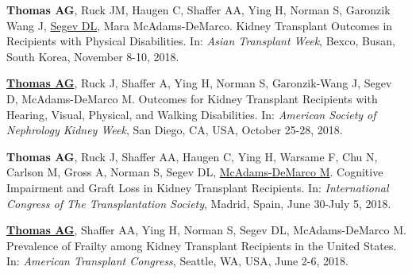 \documentclass[10pt]{article}
\makeatletter
\newlength{\bibhang}
\newlength{\bibsep}
 {\@listi \global\bibsep\itemsep \global\advance\bibsep by\parsep}
\newenvironment{bibenum*}
  {\renewcommand\labelenumi{[\theenumi]}%
   \etaremune[
     topsep=0pt,
     itemsep=\bibsep,
     parsep=0pt,partopsep=0pt,
     itemindent=-\bibhang,
     leftmargin={\bibhang+\widthof{[999]}}]}
  {\endetaremune}
\makeatother
\begin{document}
\begin{bibenum*}
\item \textbf{Thomas AG}, Ruck JM, Haugen C, Shaffer AA, Ying H,
  Norman S, Garonzik Wang J, \underline{Segev DL}, Mara McAdams-DeMarco.
  Kidney Transplant Outcomes in Recipients with Physical Disabilities.
  In: \emph{Asian Transplant Week},
  Bexco, Busan, South Korea, November 8-10, 2018.

\item \underline{\textbf{Thomas AG}}, Ruck J, Shaffer A, Ying H, Norman S,
  Garonzik-Wang J, Segev D, McAdams-DeMarco M.
  Outcomes for Kidney Transplant Recipients with Hearing, Visual, Physical,
  and Walking Disabilities.
  In: \emph{American Society of Nephrology Kidney Week},
  San Diego, CA, USA, October 25-28, 2018.


\item \textbf{Thomas AG}, Ruck J, Shaffer AA, Haugen C, Ying H,
  Warsame F, Chu N, Carlson M, Gross A, Norman S,
  Segev DL, \underline{McAdams-DeMarco M}.
  Cognitive Impairment and Graft Loss in Kidney Transplant Recipients.
  In: \emph{International Congress of The Transplantation Society},
  Madrid, Spain, June 30-July 5, 2018.



\item \underline{\textbf{Thomas AG}}, Shaffer AA, Ying H, Norman S,
  Segev DL, McAdams-DeMarco M.
  Prevalence of Frailty among Kidney Transplant Recipients in the United States.
  In: \emph{American Transplant Congress},
  Seattle, WA, USA, June 2-6, 2018.


\end{bibenum*}
\end{document}
